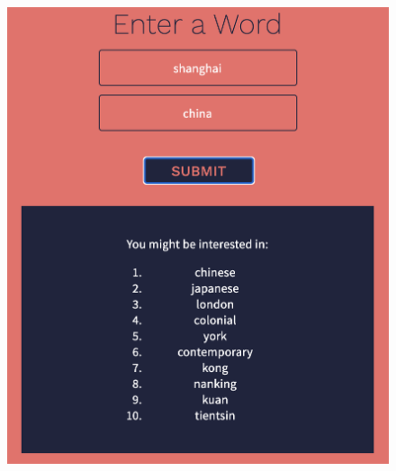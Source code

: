 \documentclass[11pt]{article}
\begin{document}
\begin{figure}[H]
\includegraphics[scale = 0.54]{17_3}
\centering
\end{figure}
\end{document}
